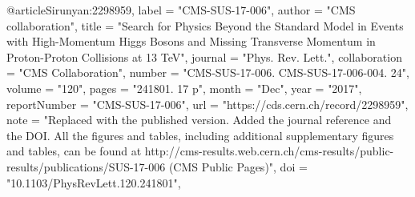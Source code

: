 @article{Sirunyan:2298959,
      label          = "CMS-SUS-17-006",
      author        = "{CMS collaboration}",
      title         = "{Search for Physics Beyond the Standard Model in Events
                       with High-Momentum Higgs Bosons and Missing Transverse
                       Momentum in Proton-Proton Collisions at 13 TeV}",
      journal       = "Phys. Rev. Lett.",
      collaboration = "CMS Collaboration",
      number        = "CMS-SUS-17-006. CMS-SUS-17-006-004. 24",
      volume        = "120",
      pages         = "241801. 17 p",
      month         = "Dec",
      year          = "2017",
      reportNumber  = "CMS-SUS-17-006",
      url           = "https://cds.cern.ch/record/2298959",
      note          = "Replaced with the published version. Added the journal
                       reference and the DOI. All the figures and tables,
                       including additional supplementary figures and tables, can
                       be found at
                       http://cms-results.web.cern.ch/cms-results/public-results/publications/SUS-17-006
                       (CMS Public Pages)",
      doi           = "10.1103/PhysRevLett.120.241801",
}

